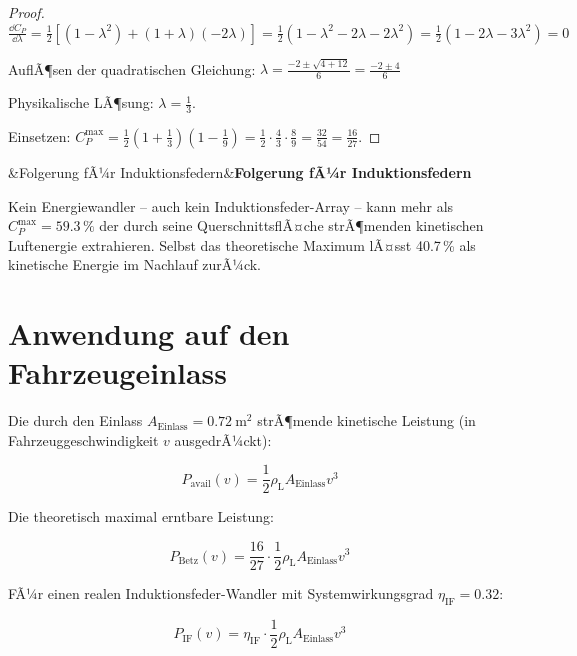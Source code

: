 ﻿\documentclass[12pt, a4paper]{report}
\newenvironment{ergebnis}[1][]{%
  \begin{ergebnisframe}\sloppy%
  \ifx&#1&\else\textbf{#1}\par\smallskip\fi}{\end{ergebnisframe}}
\theoremstyle{definition}
\theoremstyle{remark}
\newcommand{\rhoL}{\rho_{\text{L}}}
\newcommand{\Aeinlass}{A_{\text{Einlass}}}
\begin{document}
\begin{proof}
  $\frac{\dd C_P}{\dd\lambda} = \frac{1}{2}\left[(1-\lambda^2) + (1+\lambda)(-2\lambda)\right]
  = \frac{1}{2}(1-\lambda^2-2\lambda-2\lambda^2) = \frac{1}{2}(1-2\lambda-3\lambda^2) = 0$

  AuflÃ¶sen der quadratischen Gleichung:
  $\lambda = \frac{-2 \pm \sqrt{4 + 12}}{6} = \frac{-2 \pm 4}{6}$

  Physikalische LÃ¶sung: $\lambda = \frac{1}{3}$.

  Einsetzen: $C_P^{\max} = \frac{1}{2}\left(1+\frac{1}{3}\right)\left(1-\frac{1}{9}\right)
  = \frac{1}{2} \cdot \frac{4}{3} \cdot \frac{8}{9} = \frac{32}{54} = \frac{16}{27}$.
\end{proof}

\begin{ergebnis}[Folgerung fÃ¼r Induktionsfedern]
  Kein Energiewandler -- auch kein Induktionsfeder-Array -- kann mehr als
  $C_P^{\max} = 59.3\,\%$ der durch seine QuerschnittsflÃ¤che strÃ¶menden
  kinetischen Luftenergie extrahieren. Selbst das theoretische Maximum
  lÃ¤sst 40.7\,\% als kinetische Energie im Nachlauf zurÃ¼ck.
\end{ergebnis}

\section{Anwendung auf den Fahrzeugeinlass}

Die durch den Einlass $\Aeinlass = \SI{0.72}{\metre\squared}$ strÃ¶mende
kinetische Leistung (in Fahrzeuggeschwindigkeit $v$ ausgedrÃ¼ckt):

\begin{equation}
  P_{\text{avail}}(v) = \frac{1}{2}\rhoL \Aeinlass v^3
  \label{eq:p_avail}
\end{equation}

Die theoretisch maximal erntbare Leistung:

\begin{equation}
  P_{\text{Betz}}(v) = \frac{16}{27} \cdot \frac{1}{2}\rhoL \Aeinlass v^3
  \label{eq:p_betz_einlass}
\end{equation}

FÃ¼r einen realen Induktionsfeder-Wandler mit Systemwirkungsgrad $\eta_{\text{IF}} = 0.32$:

\begin{equation}
  P_{\text{IF}}(v) = \eta_{\text{IF}} \cdot \frac{1}{2}\rhoL \Aeinlass v^3
  \label{eq:p_if}
\end{equation}
\end{document}
